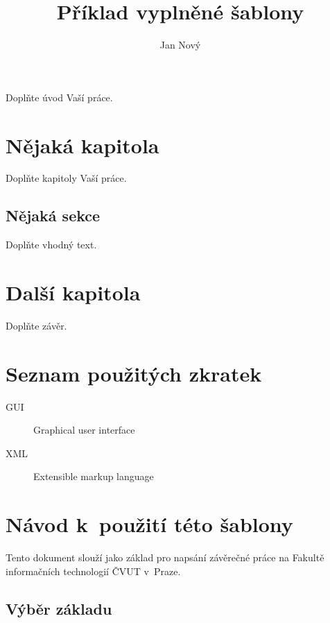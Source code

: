\documentclass[thesis=B,czech]{FITthesis}[2019/03/06]
\title{Příklad vyplněné šablony}
\author{Jan Nový} %
\begin{document}
\begin{introduction}
	Doplňte úvod Vaší práce.
\end{introduction}

\chapter{Nějaká kapitola}

Doplňte kapitoly Vaší práce.

\section{Nějaká sekce}

Doplňte vhodný text.

\chapter{Další kapitola}


\begin{conclusion}
	Doplňte závěr.
	
\end{conclusion}




\appendix

\chapter{Seznam použitých zkratek}
\begin{description}
	\item[GUI] Graphical user interface
	\item[XML] Extensible markup language
\end{description}



\chapter{Návod k~použití této šablony}

Tento dokument slouží jako základ pro napsání závěrečné práce na Fakultě informačních technologií ČVUT v~Praze.

\section{Výběr základu}
\end{document}
